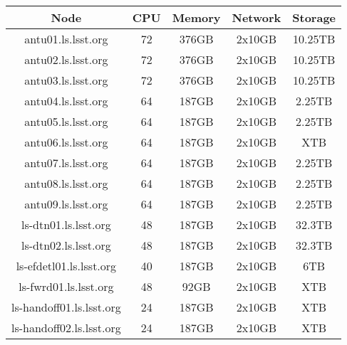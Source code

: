 \begin{center}
  \small
  \begin{tabular}{||c c c c c||}
    \hline
    \textbf{Node} & \textbf{CPU} & \textbf{Memory} & \textbf{Network} & \textbf{Storage} \\ [0.5ex]
    \hline
    antu01.ls.lsst.org & 72 & 376GB & 2x10GB & 10.25TB \\
    \hline
    antu02.ls.lsst.org & 72 & 376GB & 2x10GB & 10.25TB \\
    \hline
    antu03.ls.lsst.org & 72 & 376GB & 2x10GB & 10.25TB \\
    \hline
    antu04.ls.lsst.org & 64 & 187GB & 2x10GB & 2.25TB \\
    \hline
    antu05.ls.lsst.org & 64 & 187GB & 2x10GB & 2.25TB \\
    \hline
    antu06.ls.lsst.org & 64 & 187GB & 2x10GB & XTB \\
    \hline
    antu07.ls.lsst.org & 64 & 187GB & 2x10GB & 2.25TB \\
    \hline
    antu08.ls.lsst.org & 64 & 187GB & 2x10GB & 2.25TB \\
    \hline
    antu09.ls.lsst.org & 64 & 187GB & 2x10GB & 2.25TB \\
    \hline
    ls-dtn01.ls.lsst.org & 48 & 187GB & 2x10GB & 32.3TB \\
    \hline
    ls-dtn02.ls.lsst.org & 48 & 187GB & 2x10GB & 32.3TB \\
    \hline
    ls-efdetl01.ls.lsst.org & 40 & 187GB & 2x10GB & 6TB \\
    \hline
    ls-fwrd01.ls.lsst.org & 48 & 92GB & 2x10GB & XTB \\
    \hline
    ls-handoff01.ls.lsst.org & 24 & 187GB & 2x10GB & XTB \\
    \hline
    ls-handoff02.ls.lsst.org & 24 & 187GB & 2x10GB & XTB \\
    \hline
  \end{tabular}
\end{center}

\newpage

